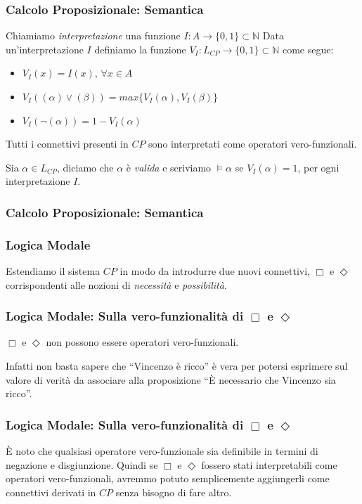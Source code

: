 \documentclass[notheorem,aspectratio=169]{beamer}
\begin{document}
\begin{frame}
\frametitle{Calcolo Proposizionale: Semantica}
Chiamiamo \emph{interpretazione} una funzione $I : A \to \{0, 1\} \subset \mathbb{N}$
Data un'interpretazione $I$ definiamo la funzione $V_I : L_{CP} \to \{0, 1\} \subset \mathbb{N}$
come segue:
\begin{itemize}
\item $V_I(x) = I(x)$, $\forall x \in A$
\item $V_I((\alpha) \lor (\beta)) = max\{V_I(\alpha), V_I(\beta)\}$
\item $V_I(\neg (\alpha)) = 1 - V_I(\alpha)$
\end{itemize}

Tutti i connettivi presenti in $CP$ sono interpretati come operatori vero-funzionali.

Sia $\alpha \in L_{CP}$, diciamo che $\alpha$ è \emph{valida} e scriviamo $\vDash \alpha$ se
$V_I(\alpha) = 1$, per ogni interpretazione $I$.
\end{frame}

\begin{frame}
\frametitle{Calcolo Proposizionale: Semantica}
\end{frame}

\begin{frame}
\frametitle{Logica Modale}
Estendiamo il sistema $CP$ in modo da introdurre due nuovi connettivi, $\Box$
e $\Diamond$ corrispondenti alle nozioni di \emph{necessità} e \emph{possibilità}.
\end{frame}

\begin{frame}
\frametitle{Logica Modale: Sulla vero-funzionalità di $\Box$ e $\Diamond$}
$\Box$ e $\Diamond$ non possono essere operatori vero-funzionali.

Infatti non basta sapere che ``Vincenzo è ricco'' è vera per potersi esprimere
sul valore di verità da associare alla proposizione ``È necessario che Vincenzo sia ricco''.
\end{frame}


\begin{frame}
\frametitle{Logica Modale: Sulla vero-funzionalità di $\Box$ e $\Diamond$}
È noto che qualsiasi operatore vero-funzionale sia definibile in termini
di negazione e disgiunzione. Quindi se $\Box$ e $\Diamond$ fossero stati interpretabili
come operatori vero-funzionali, avremmo potuto semplicemente aggiungerli come connettivi
derivati in $CP$ senza bisogno di fare altro.

\end{frame}
\end{document}
